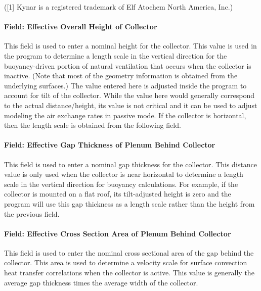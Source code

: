 ({[}1{]} Kynar is a registered trademark of Elf Atochem North America, Inc.)

\paragraph{Field: Effective Overall Height of Collector}\label{field-effective-overall-height-of-collector}

This field is used to enter a nominal height for the collector. This value is used in the program to determine a length scale in the vertical direction for the buoyancy-driven portion of natural ventilation that occurs when the collector is inactive. (Note that most of the geometry information is obtained from the underlying surfaces.) The value entered here is adjusted inside the program to account for tilt of the collector. While the value here would generally correspond to the actual distance/height, its value is not critical and it can be used to adjust modeling the air exchange rates in passive mode. If the collector is horizontal, then the length scale is obtained from the following field.

\paragraph{Field: Effective Gap Thickness of Plenum Behind Collector}\label{field-effective-gap-thickness-of-plenum-behind-collector}

This field is used to enter a nominal gap thickness for the collector. This distance value is only used when the collector is near horizontal to determine a length scale in the vertical direction for buoyancy calculations. For example, if the collector is mounted on a flat roof, its tilt-adjusted height is zero and the program will use this gap thickness as a length scale rather than the height from the previous field.

\paragraph{Field: Effective Cross Section Area of Plenum Behind Collector}\label{field-effective-cross-section-area-of-plenum-behind-collector}

This field is used to enter the nominal cross sectional area of the gap behind the collector. This area is used to determine a velocity scale for surface convection heat transfer correlations when the collector is active. This value is generally the average gap thickness times the average width of the collector.


